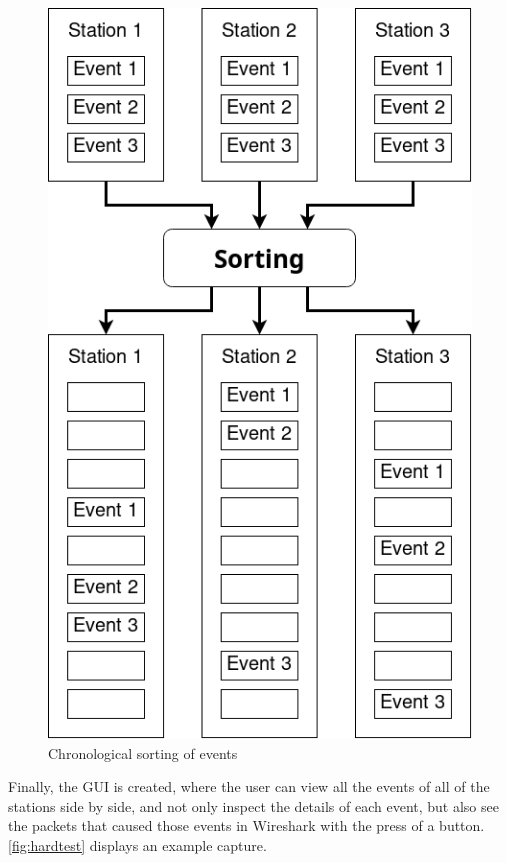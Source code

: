 \begin{figure}[htb]
   \centering
   \includegraphics[scale=.4]{eventsort}
   \caption{Chronological sorting of events}\label{fig:sort}
\end{figure}

Finally, the \ac{GUI} is created, where the user can view all the events of all
of the stations side by side, and not only inspect the details of each event,
but also see the packets that caused those events in Wireshark with the press of
a button. \autoref{fig:hardtest} displays an example capture.

